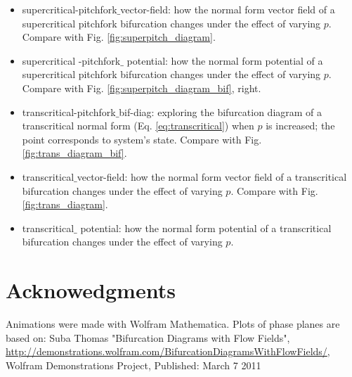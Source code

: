 \begin{itemize}
	\item supercritical-pitchfork$\_$vector-field: how the normal form vector field of a supercritical pitchfork bifurcation changes under the effect of varying $p$. Compare with Fig. \ref{fig:superpitch_diagram}.
	\item supercritical -pitchfork$\_$ potential: how the normal form potential of a supercritical pitchfork bifurcation changes under the effect of varying $p$. Compare with Fig. \ref{fig:superpitch_diagram_bif}, right.
	\item transcritical-pitchfork$\_$bif-diag: exploring the bifurcation diagram of a transcritical normal form (Eq. \ref{eq:transcritical}) when $p$  is increased; the point corresponds to system’s state. Compare with Fig. \ref{fig:trans_diagram_bif}.
	\item transcritical$\_$vector-field: how the normal form vector field of a transcritical bifurcation changes under the effect of varying $p$. Compare with Fig. \ref{fig:trans_diagram}.
	\item transcritical$\_$ potential: how the normal form potential of a transcritical bifurcation changes under the effect of varying $p$.
\end{itemize}




\section*{Acknowedgments}
Animations were made with Wolfram Mathematica. Plots of phase planes are based on: Suba Thomas "Bifurcation Diagrams with Flow Fields",  \\ \url{http://demonstrations.wolfram.com/BifurcationDiagramsWithFlowFields/}, Wolfram Demonstrations Project, Published: March 7 2011 

